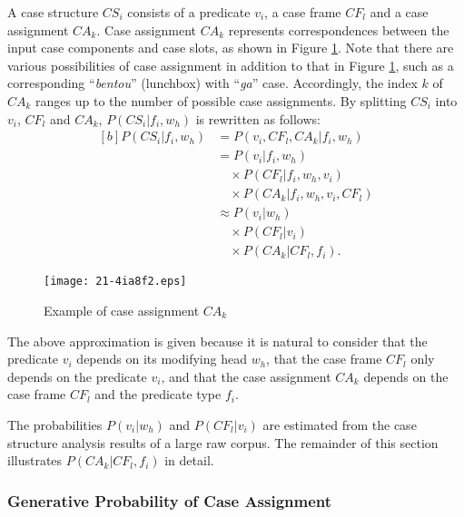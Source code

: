 \documentclass[english]{jnlp_1.4_rep}
\begin{document}
A case structure $CS_i$ consists of a predicate $v_i$, a case frame
$CF_l$ and a case assignment $CA_k$. Case assignment $CA_k$ represents
correspondences between the input case components and case slots, as shown in
Figure \ref{Figure::Correspondence}. Note that there are various
possibilities of case assignment in addition to that in Figure
\ref{Figure::Correspondence}, such as a corresponding ``\textit{bentou}''
(lunchbox) with ``\textit{ga}'' case. Accordingly, the index $k$ of $CA_k$
ranges up to the number of possible case assignments. By splitting
$CS_i$ into $v_i$, $CF_l$ and $CA_k$, $P(CS_i|f_i,w_h)$ is rewritten
as follows:
\begin{equation}
\begin{aligned}[b]
 P(CS_i|f_i,w_h) & = P(v_i,CF_l,CA_k|f_i,w_h) \\
  & = P(v_i|f_i,w_h) \\
  & \quad \times P(CF_l|f_i,w_h,v_i) \\
  & \quad \times P(CA_k|f_i,w_h,v_i,CF_l) \\
  & \approx P(v_i|w_h) \\
  & \quad \times P(CF_l|v_i) \\
  & \quad \times P(CA_k|CF_l,f_i).
\end{aligned}
\label{Formula::PA}
\end{equation}

\begin{figure}[t]
 \begin{center}
  \texttt{[image: 21-4ia8f2.eps]}
 \end{center}
  \caption{Example of case assignment $CA_k$}
  \label{Figure::Correspondence}
\end{figure}

The above approximation is given because it is natural to consider that the predicate $v_i$ depends on its
modifying head $w_h$, that the case frame $CF_l$ only depends on the
predicate $v_i$, and that the case assignment $CA_k$ depends on the case
frame $CF_l$ and the predicate type $f_i$.

The probabilities $P(v_i|w_h)$ and $P(CF_l|v_i)$ are estimated from the
case structure analysis results of a large raw corpus. The remainder of
this section illustrates $P(CA_k|CF_l,f_i)$ in detail.


\subsubsection{Generative Probability of Case Assignment}
\label{Section::格対応生成確率}
\end{document}
